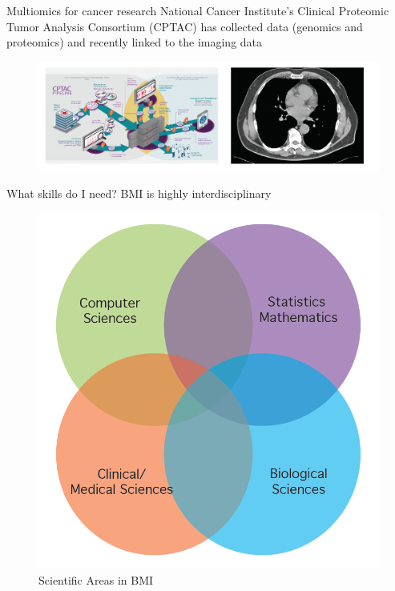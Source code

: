\documentclass{beamer}
\begin{document}
	\begin{frame}{Multiomics for cancer research }
		National Cancer Institute’s Clinical Proteomic Tumor Analysis Consortium
		(CPTAC) has collected data (genomics and proteomics) and recently linked
		to the imaging data
		\begin{figure}[h]
			\centering
			\includegraphics[scale=0.45]{Figures/multiomics.png}
		\end{figure}
	\end{frame}
	
	\begin{frame}{What skills do I need?}
		BMI is highly interdisciplinary 
		\begin{figure}[h]
			\centering
			\includegraphics[scale=0.45]{Figures/venn.png}
			\caption{Scientific Areas in BMI}
		\end{figure}
		
	\end{frame}
	
\end{document}
